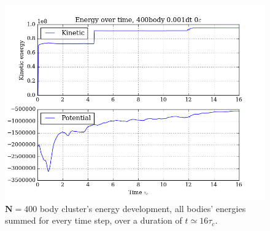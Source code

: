 \documentclass[11pt,a4paper,notitlepage,twocolumn]{article}
\begin{document}
\begin{figure}
[H]\center
\includegraphics[scale=0.35]{../figs/ClusterEnergiesSys_400body_dt1_eps0_dur16.png}
\caption{$\mathbf{N} = 400$ body cluster's energy development, all bodies' energies summed for every time step, over a duration of $t \simeq 16\tau_c$.}
\label{fig:N400eps0dur16energy}
\end{figure}
\end{document}
